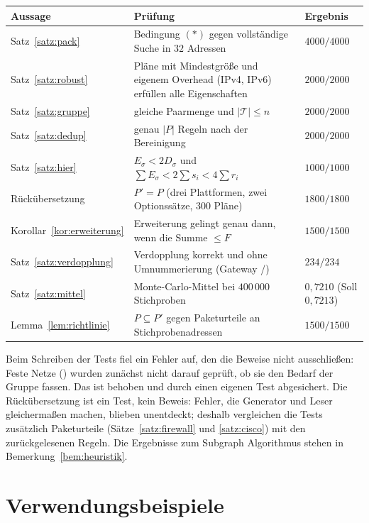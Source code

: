 \documentclass[a4paper,12pt, twoside]{report}
\theoremstyle{definition}
\newcommand{\code}[1]{\texttt{\detokenize{#1}}}
\begin{document}
\begin{center}
\small
\begin{tabular}{p{3.6cm}p{7.6cm}p{3.3cm}}
\toprule
Aussage & Prüfung & Ergebnis \\
\midrule
Satz~\ref{satz:pack} & Bedingung $(\ast)$ gegen vollständige Suche in $32$ Adressen & $4000/4000$ \\
Satz~\ref{satz:robust} & Pläne mit Mindestgröße und eigenem Overhead (IPv4, IPv6) erfüllen alle Eigenschaften & $2000/2000$ \\
Satz~\ref{satz:gruppe} & gleiche Paarmenge und $|\mathcal{T}| \le n$ & $2000/2000$ \\
Satz~\ref{satz:dedup} & genau $|P|$ Regeln nach der Bereinigung & $2000/2000$ \\
Satz~\ref{satz:hier} & $E_\sigma < 2D_\sigma$ und $\sum E_\sigma < 2\sum s_i < 4\sum r_i$ & $1000/1000$ \\
Rückübersetzung & $P' = P$ (drei Plattformen, zwei Optionssätze, $300$ Pläne) & $1800/1800$ \\
Korollar~\ref{kor:erweiterung} & Erweiterung gelingt genau dann, wenn die Summe $\le F$ & $1500/1500$ \\
Satz~\ref{satz:verdopplung} & Verdopplung korrekt und ohne Umnummerierung (Gateway \code{first}/\code{none}) & $234/234$ \\
Satz~\ref{satz:mittel} & Monte-Carlo-Mittel bei $400\,000$ Stichproben & $0{,}7210$ (Soll $0{,}7213$) \\
Lemma~\ref{lem:richtlinie} & $P \subseteq P'$ gegen Paketurteile an Stichprobenadressen & $1500/1500$ \\
\bottomrule
\end{tabular}
\end{center}

Beim Schreiben der Tests fiel ein Fehler auf, den die Beweise nicht ausschließen: Feste Netze (\code{network}) wurden zunächst nicht darauf geprüft, ob sie den Bedarf der Gruppe fassen. Das ist behoben und durch einen eigenen Test abgesichert. Die Rückübersetzung ist ein Test, kein Beweis: Fehler, die Generator und Leser gleichermaßen machen, blieben unentdeckt; deshalb vergleichen die Tests zusätzlich Paketurteile (Sätze~\ref{satz:firewall} und \ref{satz:cisco}) mit den zurückgelesenen Regeln. Die Ergebnisse zum Subgraph Algorithmus stehen in Bemerkung~\ref{bem:heuristik}.


\chapter{Verwendungsbeispiele}
\end{document}
